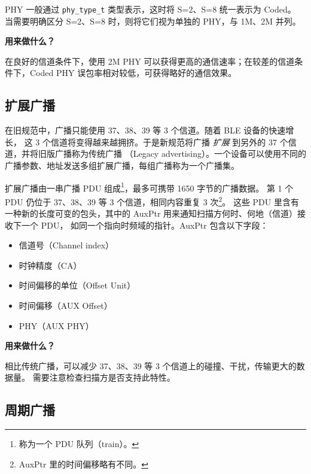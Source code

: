 \documentclass[
  12pt,
]{book}
\makeatletter
\providecommand{\tightlist}{%
  \setlength{\itemsep}{0pt}\setlength{\parskip}{0pt}}
\newenvironment{kframe}{%
\medskip{}
\setlength{\fboxsep}{.8em}
 \def\at@end@of@kframe{}%
 \ifinner\ifhmode%
  \def\at@end@of@kframe{\end{minipage}}%
  \begin{minipage}{\columnwidth}%
 \fi\fi%
 \def\FrameCommand##1{\hskip\@totalleftmargin \hskip-\fboxsep
 \colorbox{shadecolor}{##1}\hskip-\fboxsep
     \hskip-\linewidth \hskip-\@totalleftmargin \hskip\columnwidth}%
 \MakeFramed {\advance\hsize-\width
   \@totalleftmargin\z@ \linewidth\hsize
   \@setminipage}}%
 {\par\unskip\endMakeFramed%
 \at@end@of@kframe}
\newenvironment{rmdblock}[1]
  {
  \begin{itemize}
  \renewcommand{\labelitemi}{
    \raisebox{-.7\height}[0pt][0pt]{
      {\setkeys{Gin}{width=3em,keepaspectratio}\texttt{[image: images/\#1]}}
    }
  }
  \setlength{\fboxsep}{1em}
  \begin{kframe}
  \item
  }
  {
  \end{kframe}
  \end{itemize}
  }
\newenvironment{rmdnote}
  {\begin{rmdblock}{note}}
  {\end{rmdblock}}
\makeatother
\begin{document}
PHY 一般通过 \texttt{phy\_type\_t} 类型表示，这时将 S=2、S=8 统一表示为 Coded。
当需要明确区分 S=2、S=8 时，则将它们视为单独的 PHY，与 1M、2M 并列。

\begin{rmdnote}
\textbf{用来做什么？}

在良好的信道条件下，使用 2M PHY
可以获得更高的通信速率；在较差的信道条件下，Coded PHY
误包率相对较低，可获得略好的通信效果。
\end{rmdnote}

\hypertarget{ux6269ux5c55ux5e7fux64ad}{%
\subsection{扩展广播}\label{ux6269ux5c55ux5e7fux64ad}}

在旧规范中，广播只能使用 37、38、39 等 3 个信道。随着 BLE 设备的快速增长，
这 3 个信道将变得越来越拥挤。于是新规范将广播 \emph{扩展} 到另外的 37 个信道，并将旧版广播称为传统广播
（Legacy advertising）。一个设备可以使用不同的广播参数、地址发送多组扩展广播，每组广播称为一个广播集。

扩展广播由一串广播 PDU 组成\footnote{称为一个 PDU 队列（train）。}，最多可携带 1650 字节的广播数据。
第 1 个 PDU 仍位于 37、38、39 等 3 个信道，相同内容重复 3 次\footnote{AuxPtr 里的时间偏移略有不同。}。
这些 PDU 里含有一种新的长度可变的包头，其中的 AuxPtr 用来通知扫描方何时、何地（信道）接收下一个 PDU，
如同一个指向时频域的指针。AuxPtr 包含以下字段：

\begin{itemize}
\tightlist
\item
  信道号（Channel index）
\item
  时钟精度（CA）
\item
  时间偏移的单位（Offset Unit）
\item
  时间偏移（AUX Offset）
\item
  PHY（AUX PHY）
\end{itemize}

\begin{rmdnote}
\textbf{用来做什么？}

相比传统广播，可以减少 37、38、39 等 3
个信道上的碰撞、干扰，传输更大的数据量。
需要注意检查扫描方是否支持此特性。
\end{rmdnote}

\hypertarget{ux5468ux671fux5e7fux64ad}{%
\subsection{周期广播}\label{ux5468ux671fux5e7fux64ad}}
\end{document}
